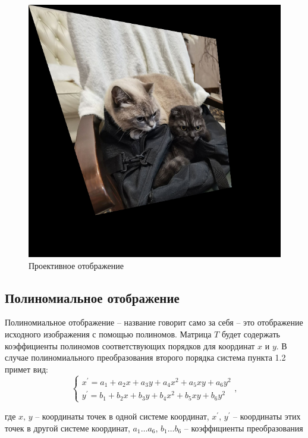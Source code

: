 \documentclass[a4paper, 16pt]{article}
\begin{document}
\newpage
\begin{figure}[!htb]
    \centering
    \includegraphics[scale=0.3]{projected_img.png}
    \captionsetup{skip=0pt}
    \caption{Проективное отображение}
    \label{Рис:13}
\end{figure}


\subsection{Полиномиальное отображение}
\noindent Полиномиальное отображение -- название говорит само за себя -- это
отображение исходного изображения с помощью полиномов. Матрица $T$ будет содержать
коэффициенты полиномов соответствующих порядков для координат $x \text { и } y$. В
случае полиномиального преобразования второго порядка система пункта 1.2 примет вид:
$$
\begin{cases}
    x^{\prime}=a_1+a_2x+a_3y+a_4x^2+a_5xy+a_6y^2\\
    y^{\prime}=b_1+b_2x+b_3y+b_4x^2+b_5xy+b_6y^2
\end{cases},
$$


\noindent где $x,\,y$ -- координаты точек в одной системе координат,
$x^{\prime},\,y^{\prime}$ -- координаты этих точек в другой системе координат,
$a_1\hdots a_6,\,b_1\hdots b_6$ -- коэффициенты преобразования
\end{document}
